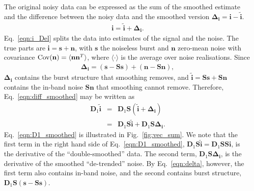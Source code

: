 \documentclass[twocolumn]{aastex631}
\begin{document}
The original noisy data can be expressed as the sum of the smoothed estimate and the difference between the noisy data and the smoothed version $\mathbf{\Delta_i}=\mathbf{i}-\tilde{\mathbf{i}}$. 
\begin{eqnarray}
\mathbf{i}=\tilde{\mathbf{i}}+\mathbf{\Delta_i}.
\label{eqn:i_Del}
\end{eqnarray}
Eq.~\eqref{eqn:i_Del} splits the data into estimates of the signal and the noise. The true parts are $\mathbf{i}=\mathbf{s}+\mathbf{n}$, with $\mathbf{s}$ the noiseless burst and $\mathbf{n}$ zero-mean noise with covariance ${\rm Cov}(\mathbf{n})=\langle\mathbf{n}\mathbf{n}^T\rangle$, where $\langle\cdot\rangle$ is the average over noise realisations. Since
\begin{eqnarray}
\mathbf{\Delta_i}=(\mathbf{s}-\mathbf{S}\mathbf{s})+(\mathbf{n}-\mathbf{S}\mathbf{n}),
\label{eqn:delta}
\end{eqnarray}
$\mathbf{\Delta_i}$ contains the burst structure that smoothing removes, and $\tilde{\mathbf{i}}=\mathbf{S}\mathbf{s}+\mathbf{S}\mathbf{n}$ contains the in-band noise $\mathbf{S}\mathbf{n}$ that smoothing cannot remove.
Therefore, Eq.~\eqref{eqn:diff_smoothed} may be written as
\begin{eqnarray}
\mathbf{D}_1\tilde{\mathbf{i}}&=&\mathbf{D}_1\mathbf{S}(\tilde{\mathbf{i}}+\mathbf{\Delta_i})\nonumber\\
&=&\mathbf{D}_1\mathbf{S}\tilde{\mathbf{i}}+\mathbf{D}_1\mathbf{S}\mathbf{\Delta_i}.
\label{eqn:D1_smoothed}
\end{eqnarray}
Eq.~\eqref{eqn:D1_smoothed} is illustrated in Fig.~\ref{fig:vec_sum}. We note that the first term in the right hand side of Eq.~\eqref{eqn:D1_smoothed}, $\mathbf{D}_1\mathbf{S}\tilde{\mathbf{i}}=\mathbf{D}_1\mathbf{S}\mathbf{S}\mathbf{i}$, is the derivative of the ``double-smoothed'' data. The second term, $\mathbf{D}_1\mathbf{S}\mathbf{\Delta_i}$, is the derivative of the smoothed ``de-trended'' noise. By Eq.~\eqref{eqn:delta}, however, the first term also contains in-band noise, and the second contains burst structure, $\mathbf{D}_1\mathbf{S}(\mathbf{s}-\mathbf{S}\mathbf{s})$. 
\end{document}
